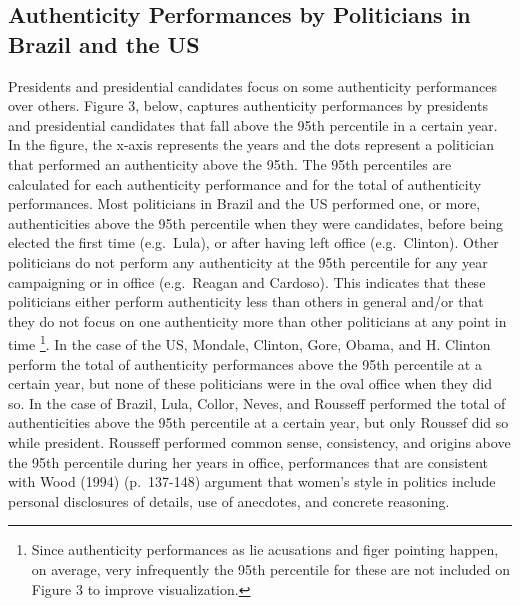 \documentclass[smallextended]{svjour3}       %
\begin{document}
\hypertarget{authenticity-performances-by-politicians-in-brazil-and-the-us}{%
\subsection{Authenticity Performances by Politicians in Brazil and the
US}\label{authenticity-performances-by-politicians-in-brazil-and-the-us}}

Presidents and presidential candidates focus on some authenticity
performances over others. Figure 3, below, captures authenticity
performances by presidents and presidential candidates that fall above
the 95th percentile in a certain year. In the figure, the x-axis
represents the years and the dots represent a politician that performed
an authenticity above the 95th. The 95th percentiles are calculated for
each authenticity performance and for the total of authenticity
performances. Most politicians in Brazil and the US performed one, or
more, authenticities above the 95th percentile when they were
candidates, before being elected the first time (e.g.~Lula), or after
having left office (e.g.~Clinton). Other politicians do not perform any
authenticity at the 95th percentile for any year campaigning or in
office (e.g.~Reagan and Cardoso). This indicates that these politicians
either perform authenticity less than others in general and/or that they
do not focus on one authenticity more than other politicians at any
point in time \footnote{ Since authenticity performances as lie
  acusations and figer pointing happen, on average, very infrequently
  the 95th percentile for these are not included on Figure 3 to improve
  visualization.}. In the case of the US, Mondale, Clinton, Gore, Obama,
and H. Clinton perform the total of authenticity performances above the
95th percentile at a certain year, but none of these politicians were in
the oval office when they did so. In the case of Brazil, Lula, Collor,
Neves, and Rousseff performed the total of authenticities above the 95th
percentile at a certain year, but only Roussef did so while president.
Rousseff performed common sense, consistency, and origins above the 95th
percentile during her years in office, performances that are consistent
with Wood (1994) (p.~137-148) argument that women's style in politics
include personal disclosures of details, use of anecdotes, and concrete
reasoning.
\end{document}
